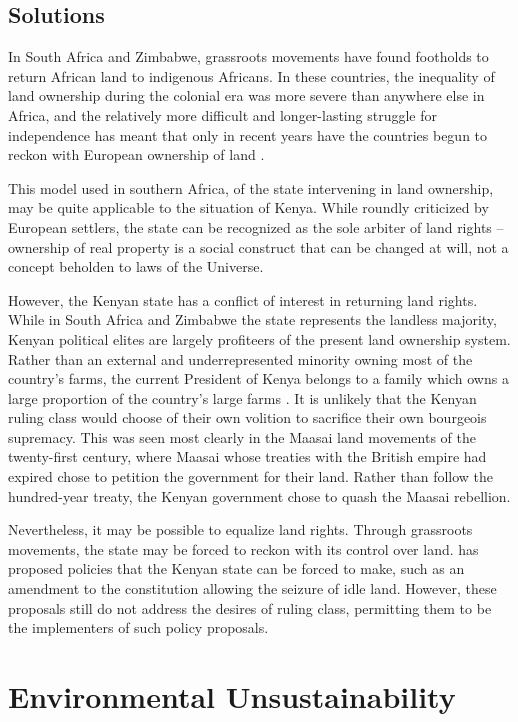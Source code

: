 \documentclass{../../../coursework}
\begin{document}
\subsection{Solutions}

In South Africa and Zimbabwe, grassroots movements have found footholds to
return African land to indigenous Africans. In these countries, the inequality
of land ownership during the colonial era was more severe than anywhere else
in Africa, and the relatively more difficult and longer-lasting struggle for
independence has meant that only in recent years have the countries begun to
reckon with European ownership of land \parencite{Syagga2006}.

This model used in southern Africa, of the state intervening in land
ownership, may be quite applicable to the situation of Kenya. While roundly
criticized by European settlers, the state can be recognized as the sole
arbiter of land rights -- ownership of real property is a social construct
that can be changed at will, not a concept beholden to laws of the Universe.

However, the Kenyan state has a conflict of interest in returning land rights.
While in South Africa and Zimbabwe the state represents the landless majority,
Kenyan political elites are largely profiteers of the present land ownership
system. Rather than an external and underrepresented minority owning most of
the country's farms, the current President of Kenya belongs to a family which
owns a large proportion of the country's large farms
\parencite{Berg-Schlosser1982}. It is unlikely that the Kenyan ruling class
would choose of their own volition to sacrifice their own bourgeois supremacy.
This was seen most clearly in the Maasai land movements of the twenty-first
century, where Maasai whose treaties with the British empire had expired chose
to petition the government for their land. Rather than follow the hundred-year
treaty, the Kenyan government chose to quash the Maasai rebellion.

Nevertheless, it may be possible to equalize land rights. Through grassroots
movements, the state may be forced to reckon with its control over land.
\textcite{Syagga2006} has proposed policies that the Kenyan state can be
forced to make, such as an amendment to the constitution allowing the seizure
of idle land. However, these proposals still do not address the desires of
ruling class, permitting them to be the implementers of such policy proposals.

\section{Environmental Unsustainability}
\end{document}
